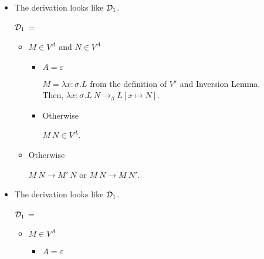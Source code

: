 \begin{itemize}
\begin{itemize}
	      \end{itemize}
	      	      
	\item \TApp
	      	      
	      The derivation looks like $\mathcal{D}_1$.
	      	      
	      $\mathcal{D}_1$ = 
	      { \andalso {}}
	      	      
	      \begin{itemize}
	      	\item $M \in V^A$ and $N \in V^A$
	      	      	      	      
	      	      \begin{itemize}
	      	      	\item $A=\varepsilon$
	      	      	      	      	      	      
	      	      	      $M = \lambda x:\sigma.L$ from the definition of $V^\varepsilon$ and Inversion Lemma.\\
	      	      	      Then, $\lambda x:\sigma.L\ N \longrightarrow_\beta L[x\mapsto N]$.
	      	      	\item Otherwise
	      	      	      	      	      	      
	      	      	      $M\ N \in V^A$.
	      	      \end{itemize}
	      	\item Otherwise
	      	      	      	      
	      	      $M\ N \longrightarrow M'\ N$ or $M\ N \longrightarrow M\ N'$.
	      \end{itemize}
	      	      
	\item \TIns
	      	      
	      The derivation looks like $\mathcal{D}_1$.
	      	      
	      $\mathcal{D}_1$ = 
	      {}
	      	      
	      \begin{itemize}
	      	\item $ M \in V^A $
	      	      	      	      
	      	      \begin{itemize}
	      	      	\item $A=\varepsilon$
	      	      	      	      	      	      

\end{itemize}
\end{itemize}
\end{itemize}
